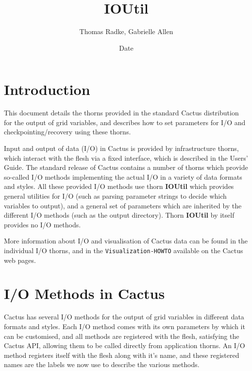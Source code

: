 \documentclass{article}
\begin{document}
\title{IOUtil}
\author{Thomas Radke, Gabrielle Allen}
\date{$ $Date$ $}

\maketitle


\section{Introduction}

This document details the thorns provided in the standard Cactus distribution
for the output of grid variables, and describes how to set parameters for I/O
and checkpointing/recovery using these thorns.

Input and output of data (I/O) in Cactus is provided by infrastructure thorns,
which interact with the flesh via a fixed interface, which is described in the
Users' Guide. The standard release of Cactus contains a number of thorns which
provide so-called I/O methods implementing the actual I/O in a variety of data
formats and styles. All these provided I/O methods use thorn {\bf IOUtil} which
provides general utilities for I/O (such as parsing
parameter strings to decide which variables to output), and a general set of
parameters which are inherited by the different I/O methods (such as the output
directory). Thorn {\bf IOUtil} by itself provides no I/O methods.

More information about I/O and visualisation of Cactus data can be found in the
individual I/O thorns, and in the {\tt Visualization-HOWTO} available on the
Cactus web pages.

\section{I/O Methods in Cactus}

Cactus has several I/O methods for the output of grid variables in different
data formats and styles. Each I/O method comes with its own parameters by which
it can be customised, and all methods are registered with the flesh, satisfying
the Cactus API, allowing them to be called directly from application thorns.
An I/O method registers itself with the flesh along with it's name, and these
registered names are the labels we now use to describe the various methods.
\end{document}
